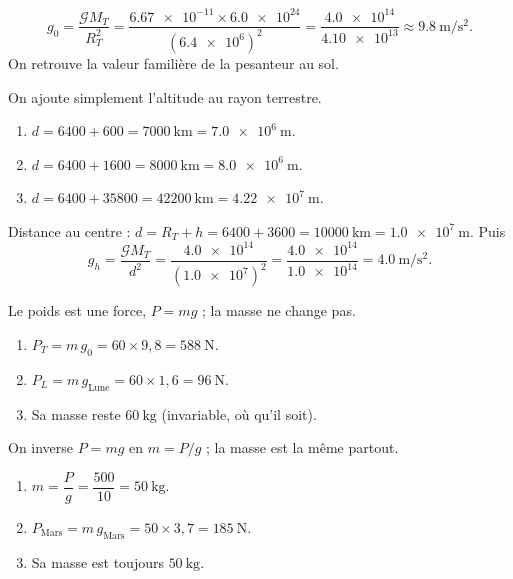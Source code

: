 \documentclass[11pt,a4paper]{article}
\begin{document}

\begin{corrige}
\[
g_0=\frac{\mathcal{G}M_T}{R_T^2}
   =\frac{\num{6.67e-11}\times\num{6.0e24}}{(\num{6.4e6})^2}
   =\frac{\num{4.0e14}}{\num{4.10e13}}\approx\qty{9.8}{\metre\per\second\squared}.
\]
On retrouve la valeur familière de la pesanteur au sol.
\end{corrige}

\begin{corrige}
On ajoute simplement l'altitude au rayon terrestre.
\begin{enumerate}[label=\alph*)]
  \item $d=6400+600=\qty{7000}{\kilo\metre}=\qty{7.0e6}{\metre}$.
  \item $d=6400+1600=\qty{8000}{\kilo\metre}=\qty{8.0e6}{\metre}$.
  \item $d=6400+35800=\qty{42200}{\kilo\metre}=\qty{4.22e7}{\metre}$.
\end{enumerate}
\end{corrige}

\begin{corrige}
Distance au centre : $d=R_T+h=6400+3600=\qty{10000}{\kilo\metre}=\qty{1.0e7}{\metre}$. Puis
\[
g_h=\frac{\mathcal{G}M_T}{d^2}=\frac{\num{4.0e14}}{(\num{1.0e7})^2}
   =\frac{\num{4.0e14}}{\num{1.0e14}}=\qty{4.0}{\metre\per\second\squared}.
\]
\end{corrige}

\begin{corrige}
Le poids est une force, $P=mg$ ; la masse ne change pas.
\begin{enumerate}[label=\alph*)]
  \item $P_T=m\,g_0=60\times 9{,}8=\qty{588}{\newton}$.
  \item $P_L=m\,g_{\text{Lune}}=60\times 1{,}6=\qty{96}{\newton}$.
  \item Sa masse reste $\qty{60}{\kilogram}$ (invariable, où qu'il soit).
\end{enumerate}
\end{corrige}

\begin{corrige}
On inverse $P=mg$ en $m=P/g$ ; la masse est la même partout.
\begin{enumerate}[label=\alph*)]
  \item $m=\dfrac{P}{g}=\dfrac{500}{10}=\qty{50}{\kilogram}$.
  \item $P_{\text{Mars}}=m\,g_{\text{Mars}}=50\times 3{,}7=\qty{185}{\newton}$.
  \item Sa masse est toujours $\qty{50}{\kilogram}$.
\end{enumerate}
\end{corrige}
\end{document}
